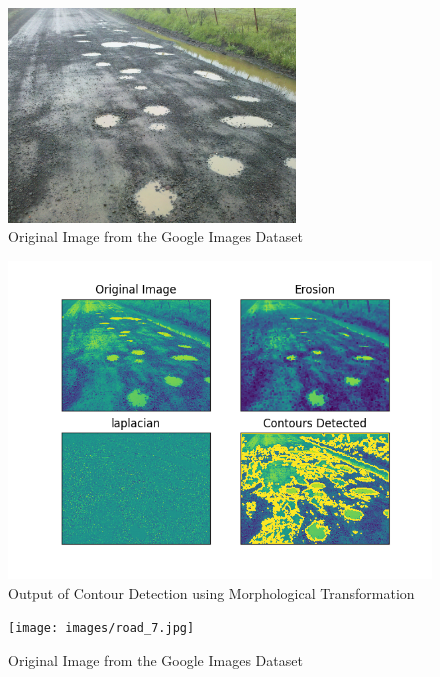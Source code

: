 \documentclass[12pt,a4paper]{article}
\begin{document}
\begin{itemize}
\begin{figure}[ht!]
        \centering
        \includegraphics[width = 3in]{images/road_11.jpg}
        \caption{Original Image from the Google Images Dataset}
    \end{figure}

    \begin{figure}[ht!]
        \centering
        \includegraphics[width = 5in]{images/morph_transform_2.png}
        \caption{Output of Contour Detection using Morphological Transformation}
    \end{figure}
    \pagebreak
    
    \begin{figure}[ht!]
        \centering
        \texttt{[image: images/road\_7.jpg]}
        \caption{Original Image from the Google Images Dataset}
    \end{figure}


\end{itemize}
\end{document}
